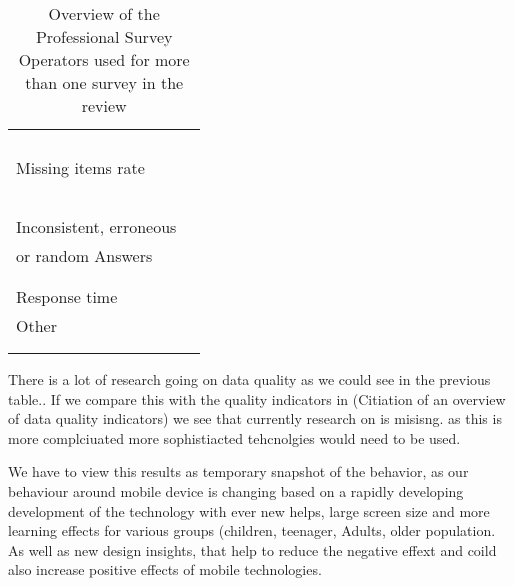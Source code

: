 \begin{table}
\begin{tabular}{ll}
    	& \cite{revilla_comparing_2018, mavletova_data_2013}\\
    	& \cite{daikeler_motivated_2020, lugtig_recruiting_2019}\\
    	& \cite{toepoel_sliders_2018, struminskaya_effects_2015}\\
    	& \cite{lugtig_use_2016, keusch_web_2017}\\
        Missing items rate & \cite{revilla_are_2017, erens_comparing_2019}\\
    	& \cite{revilla_comparing_2018, lee_experimental_2019}\\
    	& \cite{buskirk_making_2014, daikeler_motivated_2020}\\
    	& \cite{toepoel_sliders_2018, struminskaya_effects_2015}\\
    	& \cite{lugtig_use_2016, tourangeau_web_2018}\\
    	& \cite{keusch_web_2017}\\
        Inconsistent, erroneous & \cite{revilla_comparing_2018, weigold_computerized_2021}\\
    	or random Answers& \cite{hartman_does_2019, bosch_measurement_2019}\\
    	& \cite{antoun_simultaneous_2019, skeie_smartphone_2019}\\
    	& \cite{revilla_testing_2018, huff_comparison_2015}\\
        Response time & \cite{liebe_does_2015, schlosser_mobile_2018}\\
        Other & \cite{revilla_are_2017, revilla_comparing_2018}\\
    	& \cite{de_bruijne_comparing_2013, mavletova_data_2013}\\
    	& \cite{antoun_factors_2020}\\
		\bottomrule 
	\end{tabular}
	\caption{Overview of the Professional Survey Operators used for more than one survey in the review}
	\label{tab: quality_part_2}
\end{table}

There is a lot of research going on data quality as we could see in the previous table.. If we compare this with the quality indicators in (Citiation of an overview of data quality indicators) we see that currently research on is misisng. as this is more complciuated more sophistiacted tehcnolgies would need to be used. 




We have to view this results as temporary snapshot of the behavior, as our behaviour around mobile device is changing based on a rapidly developing development of the technology with ever new helps, large screen size and more learning effects for various groups (children, teenager, Adults, older population. As well as new design insights, that help to reduce the negative effext and coild also increase positive effects of mobile technologies.

